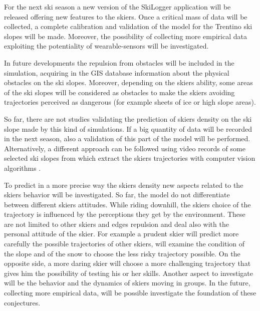 \documentclass[12pt,a4paper,twoside]{book}
\begin{document}
For the next ski season a new version of the SkiLogger application will be released offering new features to the skiers. Once a critical mass of data will be collected, a complete calibration and validation of the model for the Trentino ski slopes will be made. Moreover, the possibility of collecting more empirical data exploiting the potentiality of wearable-sensors will be investigated.

In future developments the repulsion from obstacles will be included in the simulation, acquiring in the GIS database information about the physical obstacles on the ski slopes. Moreover, depending on the skiers ability, some areas of the ski slopes will be considered as obstacles to make the skiers avoiding trajectories perceived as dangerous (for example sheets of ice or high slope areas).

So far, there are not studies validating the prediction of skiers density on the ski slope made by this kind of simulations. If a big quantity of data will be recorded in the next season, also a validation of this part of the model will be performed. Alternatively, a different approach can be followed using video records of some selected ski slopes from which extract the skiers trajectories with computer vision algorithms \cite{sc2010}.

To predict in a more precise way the skiers density new aspects related to the skiers behavior will be investigated. So far, the model do not differentiate between different skiers attitudes. While riding downhill, the skiers choice of the trajectory is influenced by the perceptions they get by the environment. These are not limited to other skiers and edges repulsion and deal also with the personal attitude of the skier. For example a prudent skier will predict more carefully the possible trajectories of other skiers, will examine the condition of the slope and of the snow to choose the less risky trajectory possible. On the opposite side, a more daring skier will choose a more challenging trajectory that gives him the possibility of testing his or her skills. Another aspect to investigate will be the behavior and the dynamics of skiers moving in groups. In the future, collecting more empirical data, will be possible investigate the foundation of these conjectures.



\appendix
\end{document}
